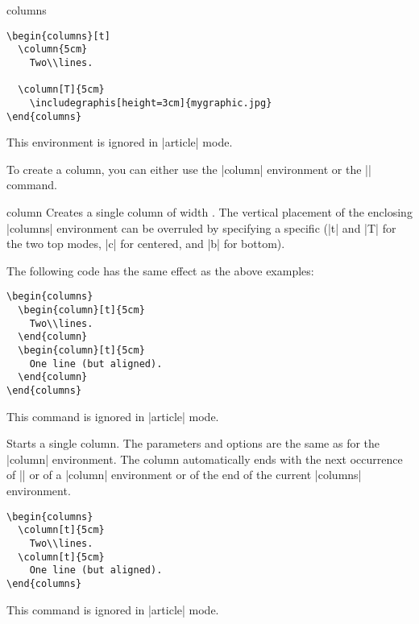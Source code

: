 \begin{environment}{{columns}}
  \example
\begin{verbatim}
\begin{columns}[t]
  \column{5cm}
    Two\\lines.

  \column[T]{5cm}
    \includegraphis[height=3cm]{mygraphic.jpg}
\end{columns}
\end{verbatim}

  \articlenote
  This environment is ignored in |article| mode.

\end{environment}

To create a column, you can either use the |column| environment or the |\column| command.

\begin{environment}{{column}}
  Creates a single column of width . The vertical placement of the enclosing |columns| environment can be overruled by specifying a specific  (|t| and |T| for the two top modes, |c| for centered, and |b| for bottom).

  \example
  The following code has the same effect as the above examples:
\begin{verbatim}
\begin{columns}
  \begin{column}[t]{5cm}
    Two\\lines.
  \end{column}
  \begin{column}[t]{5cm}
    One line (but aligned).
  \end{column}
\end{columns}
\end{verbatim}

  \articlenote
  This command is ignored in |article| mode.

\end{environment}

\begin{command}{{\column}}
  Starts a single column. The parameters and options are the same as for the |column| environment. The column automatically ends with the next occurrence of |\column| or of a |column| environment or of the end of the current |columns| environment.

  \example
\begin{verbatim}
\begin{columns}
  \column[t]{5cm}
    Two\\lines.
  \column[t]{5cm}
    One line (but aligned).
\end{columns}
\end{verbatim}

  \articlenote
  This command is ignored in |article| mode.

\end{command}


